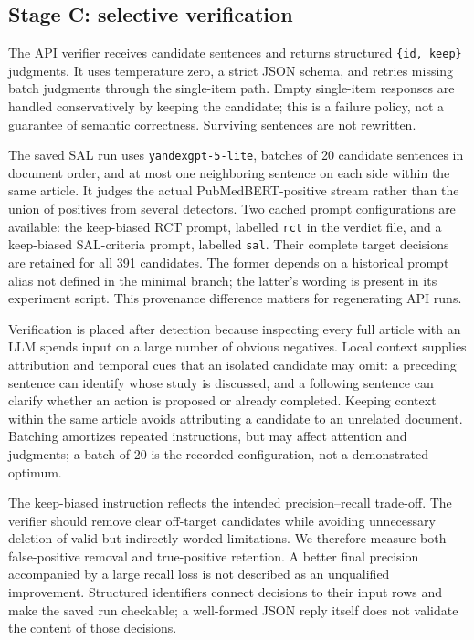 \subsection{Stage C: selective verification}
\label{S:stage-c}

The API verifier receives candidate sentences and returns structured \texttt{\{id, keep\}}
judgments. It uses temperature zero, a strict JSON schema, and retries missing batch judgments
through the single-item path. Empty single-item responses are handled conservatively by keeping
the candidate; this is a failure policy, not a guarantee of semantic correctness. Surviving
sentences are not rewritten.

The saved SAL run uses \texttt{yandexgpt-5-lite}, batches of 20 candidate sentences in document
order, and at most one neighboring sentence on each side within the same article. It judges the
actual PubMedBERT-positive stream rather than the union of positives from several detectors.
Two cached prompt configurations are available: the keep-biased RCT prompt, labelled
\texttt{rct} in the verdict file, and a keep-biased SAL-criteria prompt, labelled \texttt{sal}.
Their complete target decisions are retained for all 391 candidates. The former depends on a
historical prompt alias not defined in the minimal branch; the latter's wording is present in
its experiment script. This provenance difference matters for regenerating API runs.

Verification is placed after detection because inspecting every full article with an LLM spends
input on a large number of obvious negatives. Local context supplies attribution and temporal cues
that an isolated candidate may omit: a preceding sentence can identify whose study is discussed,
and a following sentence can clarify whether an action is proposed or already completed. Keeping
context within the same article avoids attributing a candidate to an unrelated document. Batching
amortizes repeated instructions, but may affect attention and judgments; a batch of 20 is the
recorded configuration, not a demonstrated optimum.

The keep-biased instruction reflects the intended precision--recall trade-off. The verifier should
remove clear off-target candidates while avoiding unnecessary deletion of valid but indirectly
worded limitations. We therefore measure both false-positive removal and true-positive retention.
A better final precision accompanied by a large recall loss is not described as an unqualified
improvement. Structured identifiers connect decisions to their input rows and make the saved run
checkable; a well-formed JSON reply itself does not validate the content of those decisions.

